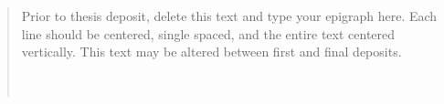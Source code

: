 \vspace*{\fill} 
\begin{quote}
\centering
Prior to thesis deposit, delete this text and type your epigraph here.  Each line should be centered, single spaced, and the entire text centered vertically.  
This text may be altered between first and final deposits.\\
\mylinespacing
\myname \\
\sourcetitle \\
\mylinespacing
\myoptpg
\end{quote}
\vspace*{\fill}